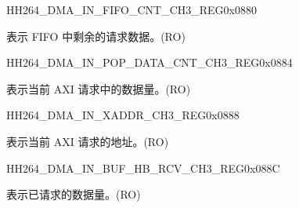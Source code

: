\begin{register}{H}{H264\_DMA\_IN\_FIFO\_CNT\_CH3\_REG}{0x0880}\label{regdesc:H264DMAINFIFOCNTCH3REG}
%
%
\regnewline%
\begin{regdesc}\begin{reglist}
\label{fielddesc:H264DMAINCMDFIFOINFIFOCNTCH3}\item [H264\_DMA\_IN\_CMDFIFO\_INFIFO\_CNT\_CH3] 表示 FIFO 中剩余的请求数据。(RO)
\end{reglist}\end{regdesc}
\end{register}


\begin{register}{H}{H264\_DMA\_IN\_POP\_DATA\_CNT\_CH3\_REG}{0x0884}\label{regdesc:H264DMAINPOPDATACNTCH3REG}
%
%
\regnewline%
\begin{regdesc}\begin{reglist}
\label{fielddesc:H264DMAINCMDFIFOPOPDATACNTCH3}\item [H264\_DMA\_IN\_CMDFIFO\_POP\_DATA\_CNT\_CH3] 表示当前 AXI 请求中的数据量。(RO)
\end{reglist}\end{regdesc}
\end{register}


\begin{register}{H}{H264\_DMA\_IN\_XADDR\_CH3\_REG}{0x0888}\label{regdesc:H264DMAINXADDRCH3REG}
%
\regnewline%
\begin{regdesc}\begin{reglist}
\label{fielddesc:H264DMAINCMDFIFOXADDRCH3}\item [H264\_DMA\_IN\_CMDFIFO\_XADDR\_CH3] 表示当前 AXI 请求的地址。(RO)
\end{reglist}\end{regdesc}
\end{register}


\begin{register}{H}{H264\_DMA\_IN\_BUF\_HB\_RCV\_CH3\_REG}{0x088C}\label{regdesc:H264DMAINBUFHBRCVCH3REG}
%
%
\regnewline%
\begin{regdesc}\begin{reglist}
\label{fielddesc:H264DMAINCMDFIFOBUFHBRCVCH3}\item [H264\_DMA\_IN\_CMDFIFO\_BUF\_HB\_RCV\_CH3] 表示已请求的数据量。(RO)
\end{reglist}\end{regdesc}
\end{register}

